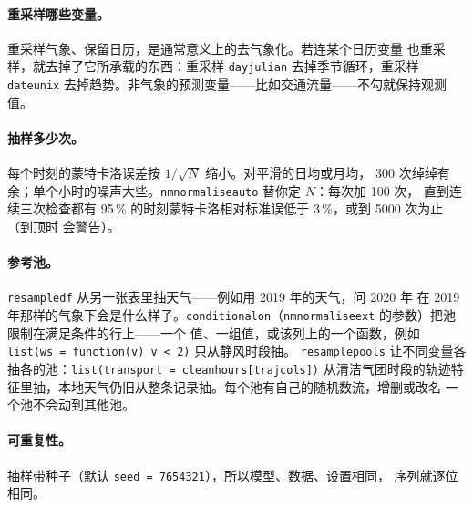 \documentclass[11pt]{ctexrep}
\newcommand{\codeunderscore}{\textunderscore\allowbreak}
\newcommand{\code}[1]{\texttt{\let\_\codeunderscore #1}}
\begin{document}
\paragraph{重采样哪些变量。}重采样气象、保留日历，是通常意义上的去气象化。若连某个日历变量
也重采样，就去掉了它所承载的东西：重采样 \code{day\_julian} 去掉季节循环，重采样
\code{date\_unix} 去掉趋势。非气象的预测变量——比如交通流量——不勾就保持观测值。

\paragraph{抽样多少次。}每个时刻的蒙特卡洛误差按 $1/\sqrt{N}$ 缩小。对平滑的日均或月均，
300 次绰绰有余；单个小时的噪声大些。\code{nm\_normalise\_auto} 替你定 $N$：每次加 100 次，
直到连续三次检查都有 95\,\% 的时刻蒙特卡洛相对标准误低于 3\,\%，或到 5000 次为止（到顶时
会警告）。

\paragraph{参考池。}\code{resample\_df} 从另一张表里抽天气——例如用 2019 年的天气，问 2020 年
在 2019 年那样的气象下会是什么样子。\code{conditional\_on}（\code{nm\_normalise\_ext} 的参数）把池限制在满足条件的行上——一个
值、一组值，或该列上的一个函数，例如 \code{list(ws = function(v) v < 2)} 只从静风时段抽。
\code{resample\_pools} 让不同变量各抽各的池：\code{list(transport = clean\_hours[traj\_cols])}
从清洁气团时段的轨迹特征里抽，本地天气仍旧从整条记录抽。每个池有自己的随机数流，增删或改名
一个池不会动到其他池。

\paragraph{可重复性。}抽样带种子（默认 \code{seed = 7654321}），所以模型、数据、设置相同，
序列就逐位相同。
\end{document}
